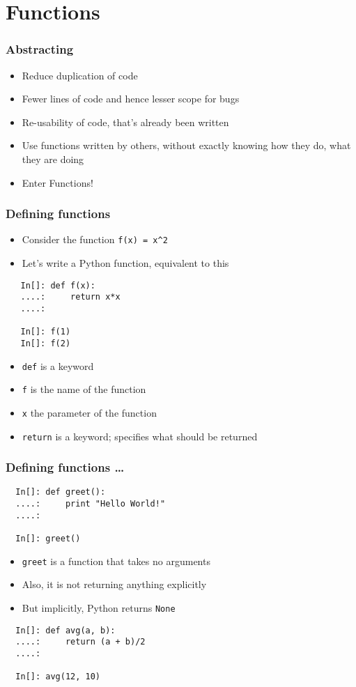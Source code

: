 \section{Functions}

\begin{frame}[fragile]
  \frametitle{Abstracting}
  \begin{itemize}
  \item Reduce duplication of code
  \item Fewer lines of code and hence lesser scope for bugs
  \item Re-usability of code, that's already been written
  \item Use functions written by others, without exactly knowing how
    they do, what they are doing
  \item \alert{Enter Functions!}
  \end{itemize}
\end{frame}


\begin{frame}[fragile]
  \frametitle{Defining functions}
  \begin{itemize}
  \item Consider the function \texttt{f(x) = x\textasciicircum{}2}
  \item Let's write a Python function, equivalent to this
  \end{itemize}
  \begin{lstlisting}
   In[]: def f(x):
   ....:     return x*x
   ....:

   In[]: f(1)
   In[]: f(2)
  \end{lstlisting}
  \begin{itemize}
  \item \texttt{def} is a keyword  
  \item \texttt{f} is the name of the function 
  \item \texttt{x} the parameter of the function
  \item \texttt{return} is a keyword; specifies what should be
    returned
  \end{itemize}
\end{frame}

\begin{frame}[fragile]
  \frametitle{Defining functions \ldots}
  \begin{lstlisting}
  In[]: def greet():
  ....:     print "Hello World!"
  ....:

  In[]: greet()
  \end{lstlisting}
  \begin{itemize}
  \item \texttt{greet} is a function that takes no arguments
  \item Also, it is not returning anything explicitly
  \item But implicitly, Python returns \texttt{None}
  \end{itemize}
  \begin{lstlisting}
  In[]: def avg(a, b):
  ....:     return (a + b)/2
  ....:
      
  In[]: avg(12, 10)
  \end{lstlisting}
\end{frame}

